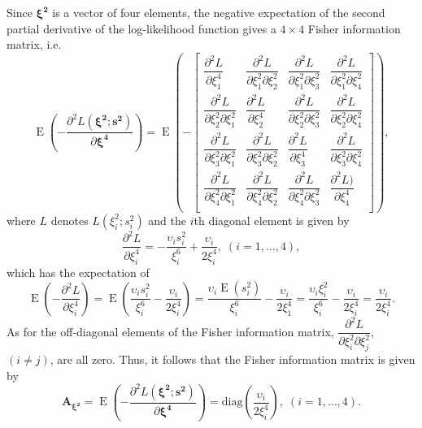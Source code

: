 \documentclass[12pt,a4paper]{article}
\newcommand{\A}{\mathbf{A}}
\begin{document}
Since $\bm{\xi^2}$ is a vector of four elements, the negative expectation of the second partial derivative of the log-likelihood function gives a $4 \times 4$ Fisher information matrix, i.e.\
\[  \operatorname{E} \left(-\dfrac{\partial^2 L(\bm{\xi^2};\bm{s^2})}{\partial \bm{\xi^4}}\right) =  \operatorname{E}\left( -\begin{bmatrix}               
\dfrac{\partial^2 L}{\partial \xi_1^4} &  \dfrac{\partial^2 L}{\partial \xi_1^2\partial \xi_2^2} &  \dfrac{\partial^2 L}{\partial \xi_1^2\partial \xi_3^2} & \dfrac{\partial^2 L}{\partial \xi_1^2\partial \xi_4^2}  \\
 \dfrac{\partial^2 L}{\partial \xi_2^2\partial \xi_1^2} & \dfrac{\partial^2 L}{\partial \xi_2^4} &  \dfrac{\partial^2 L}{\partial \xi_2^2\partial \xi_3^2} & \dfrac{\partial^2 L}{\partial \xi_2^2\partial \xi_4^2} \\
 \dfrac{\partial^2 L}{\partial \xi_3^2\partial \xi_1^2} &  \dfrac{\partial^2 L}{\partial \xi_3^2\partial \xi_2^2} & \dfrac{\partial^2 L}{\partial \xi_3^4} &  \dfrac{\partial^2 L}{\partial \xi_3^2\partial \xi_4^2}  \\
\dfrac{\partial^2 L}{\partial \xi_4^2\partial \xi_1^2} & \dfrac{\partial^2 L}{\partial \xi_4^2\partial \xi_2^2} &  \dfrac{\partial^2 L}{\partial \xi_4^2\partial \xi_3^2} & \dfrac{\partial^2 L)}{\partial \xi_4^4} \\
\end{bmatrix}\right),  \] 
where $L$ denotes $L(\xi_i^2;s_i^2)$ and the $i$th diagonal element is given by
\[\dfrac{\partial^2 L}{\partial \xi_i^4} = -\dfrac{\upsilon_i s_i^2 }{\xi_i^6} + \dfrac{\upsilon_i }{2\xi_i^4},\; ( i = 1, \dots, 4), \]
which has the expectation of
\[ \operatorname{E} \left( -\dfrac{\partial^2 L}{\partial \xi_i^4} \right) = \operatorname{E} \left(\dfrac{\upsilon_i s_i^2 }{\xi_i^6} - \dfrac{\upsilon_i }{2\xi_i^4}\right) = \dfrac{\upsilon_i  \operatorname{E}(s_i^2) }{\xi_i^6} - \dfrac{\upsilon_i }{2\xi_1^4} =  \dfrac{\upsilon_i  \xi_i^2 }{\xi_i^6} - \dfrac{\upsilon_i }{2\xi_i^4} =  \dfrac{\upsilon_i }{2\xi_i^4}.\] As for the off-diagonal elements of the Fisher information matrix, $\dfrac{\partial^2 L}{\partial \xi_i^2\partial \xi_j^2}$, $(i \neq j)$, are all zero. Thus, it follows that the Fisher information matrix is given by 
\begin{equation}\label{eq:fishInfoOld}
\A_{\bm{\xi^2}} =  \operatorname{E} \left(-\dfrac{\partial^2 L(\bm{\xi^2};\bm{s^2})}{\partial \bm{\xi^4}}\right) = \mathrm{diag} \left( \dfrac{\upsilon_i }{2\xi_i^4}\right),\; (i = 1, \dots, 4).
\end{equation}
\end{document}
